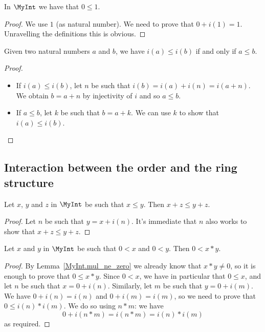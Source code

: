 \begin{lemma}
    \label{MyInt.zero_le_one}
    \leanok
    In $\MyInt$ we have that $0 \leq 1$.
\end{lemma}
\begin{proof}
    \leanok
    We use $1$ (as natural number). We need to prove that $0 + i(1) = 1$. Unravelling the definitions
    this is obvious.
\end{proof}

\begin{lemma}
    \label{MyInt.i_le_iff}
    \leanok
    Given two natural numbers $a$ and $b$, we have $i(a) \leq i(b)$ if and only if $a \leq b$.
\end{lemma}
\begin{proof}
    \leanok
    \begin{itemize}
        \item If $i(a) \leq i(b)$, let $n$ be such that $i(b) = i(a)+i(n)=i(a+n)$. We obtain $b = a + n$ by injectivity of $i$ and so $a \leq b$.
        \item If $a \leq b$, let $k$ be such that $b = a + k$. We can use $k$ to show that $i(a) \leq i(b)$.
    \end{itemize}
\end{proof}

\subsection{Interaction between the order and the ring structure}

\begin{lemma}
    \label{MyInt.add_le_add_left}
    \leanok
    Let $x$, $y$ and $z$ in $\MyInt$ be such that $x \leq y$. Then $x + z \leq y + z$.
\end{lemma}
\begin{proof}
    \leanok
    Let $n$ be such that $y = x + i(n)$. It's immediate that $n$ also works to show that $x + z \leq y + z$.
\end{proof}

\begin{lemma}
    \label{MyInt.mul_pos}
    \leanok
    Let $x$ and $y$ in $\MyInt$ be such that $0 < x$ and $0 < y$. Then $0 < x * y$.
\end{lemma}
\begin{proof}
    \leanok
    By Lemma~\ref{MyInt.mul_ne_zero} we already know that $x*y \neq 0$, so it is enough to prove that
    $0 \leq x*y$. Since $0 < x$, we have in particular that $0 \leq x$, and let $n$ be such that $x = 0 + i(n)$. Similarly, let $m$ be such that $y = 0 + i(m)$. We have $0 + i(n) = i(n)$ and $0 + i(m) = i(m)$, so we need to prove that $0 \leq i(n)*i(m)$. We do so using $n*m$: we have
    \[
    0+i(n*m)=i(n*m)=i(n)*i(m)
    \]
    as required.
\end{proof}

